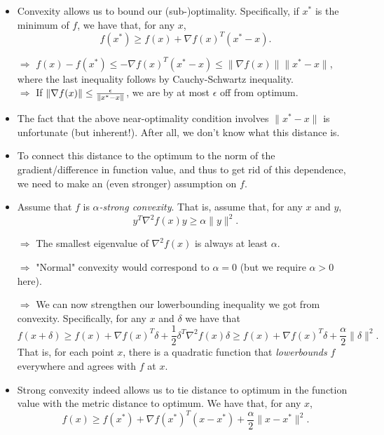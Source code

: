 \documentclass{article}
\begin{document}
\begin{itemize}
\item Convexity allows us to bound our (sub-)optimality. Specifically, if $x^*$ is the minimum of $f$, we have that, for any $x$, 
\[
f(x^*)\geq f(x) + \nabla f(x)^T(x^*-x).
\]

$\Rightarrow$ $f(x)-f(x^*)\leq -\nabla f(x)^T(x^*-x)\leq \|\nabla f(x)\|\|x^*-x\|$,
where the last inequality follows by Cauchy-Schwartz inequality. \\

$\Rightarrow$ If $\|\nabla f(x)\|\leq \frac{\epsilon}{\|x^*-x\|}$, we are by at most $\epsilon$ off from optimum. 

\item The fact that the above near-optimality condition involves $\|x^*-x\|$ is unfortunate (but inherent!). After all, we don't know what this distance is.

\item To connect this distance to the optimum to the norm of the gradient/difference in function value, and thus to get rid of this dependence, we need to make an (even stronger)  assumption on $f$. 

\item Assume that $f$ is {\em $\alpha$-strong convexity}. That is, assume that, for any $x$ and $y$, 
\[
y^T \nabla^2 f(x) y \geq \alpha \|y\|^2.
\] 

$\Rightarrow$ The smallest eigenvalue of $\nabla^2f(x)$ is always at least $\alpha$. 

$\Rightarrow$ "Normal" convexity would correspond to $\alpha=0$ (but we require $\alpha>0$ here).

$\Rightarrow$ We can now strengthen our lowerbounding inequality we got from convexity. Specifically, for any $x$ and $\delta$ we have that
\[
f(x+\delta) \geq f(x) + \nabla f(x)^T\delta + \frac{1}{2} \delta^T \nabla^2 f(x)\delta\geq f(x)+ \nabla f(x)^T\delta + \frac{\alpha}{2} \|\delta\|^2.
\]
That is, for each point $x$, there is a quadratic function that {\em lowerbounds} $f$ everywhere and agrees with $f$ at $x$.

\item Strong convexity indeed allows us to tie distance to optimum in the function value with the metric distance to optimum. We have that, for any $x$, 
\[
f(x)\geq f(x^*)+\nabla f(x^*)^T (x-x^*) + \frac{\alpha}{2}\|x-x^*\|^2.
\]


\end{itemize}
\end{document}
